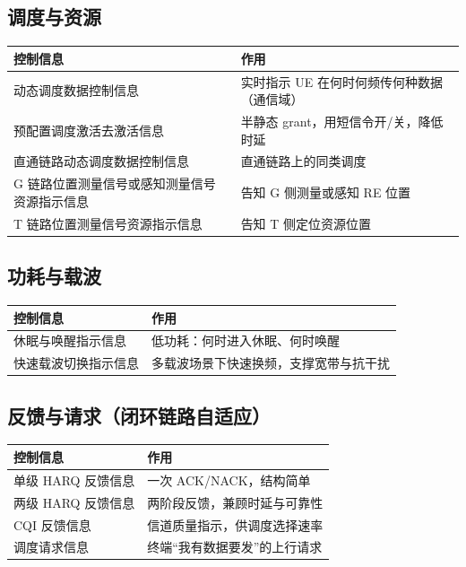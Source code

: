 \documentclass[11pt,a4paper]{ctexart}
\begin{document}
\subsection{调度与资源}

\begin{table}[h]
\centering
\small
\begin{tabular}{ll}
\toprule
\textbf{控制信息} & \textbf{作用} \\
\midrule
动态调度数据控制信息 & 实时指示 UE 在何时何频传何种数据（通信域） \\
预配置调度激活去激活信息 & 半静态 grant，用短信令开/关，降低时延 \\
直通链路动态调度数据控制信息 & 直通链路上的同类调度 \\
G 链路位置测量信号或感知测量信号资源指示信息 & 告知 G 侧测量或感知 RE 位置 \\
T 链路位置测量信号资源指示信息 & 告知 T 侧定位资源位置 \\
\bottomrule
\end{tabular}
\end{table}

\subsection{功耗与载波}

\begin{table}[h]
\centering
\small
\begin{tabular}{ll}
\toprule
\textbf{控制信息} & \textbf{作用} \\
\midrule
休眠与唤醒指示信息 & 低功耗：何时进入休眠、何时唤醒 \\
快速载波切换指示信息 & 多载波场景下快速换频，支撑宽带与抗干扰 \\
\bottomrule
\end{tabular}
\end{table}

\subsection{反馈与请求（闭环链路自适应）}

\begin{table}[h]
\centering
\small
\begin{tabular}{ll}
\toprule
\textbf{控制信息} & \textbf{作用} \\
\midrule
单级 HARQ 反馈信息 & 一次 ACK/NACK，结构简单 \\
两级 HARQ 反馈信息 & 两阶段反馈，兼顾时延与可靠性 \\
CQI 反馈信息 & 信道质量指示，供调度选择速率 \\
调度请求信息 & 终端``我有数据要发''的上行请求 \\
\bottomrule
\end{tabular}
\end{table}
\end{document}
